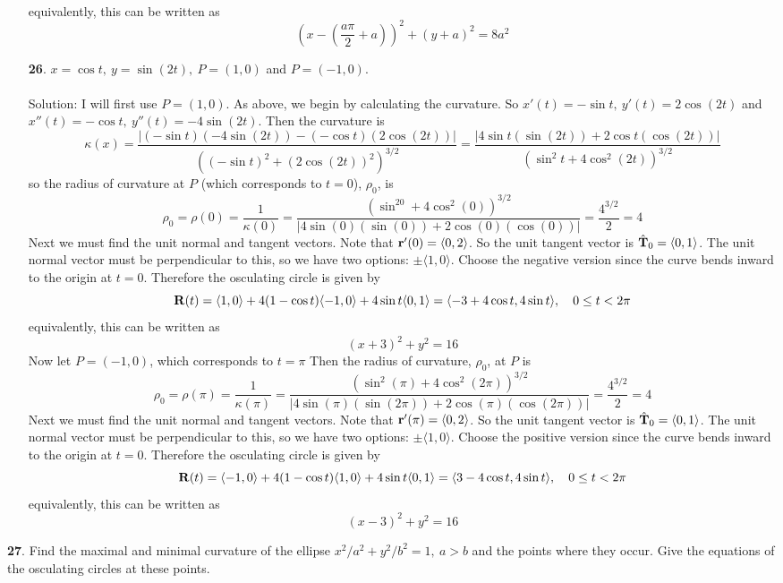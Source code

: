 \documentclass[12pt]{amsbook}
\newcommand{\la}{\langle}
\newcommand{\ra}{\rangle}
\begin{document}
\begin{enumerate}
\begin{eqnarray*}
\end{eqnarray*}  
  equivalently, this can be written as
  $$(x-(\frac{a\pi}{2}+a))^2+(y+a)^2=8a^2$$  
  \item[{\small\bf 26}.] $x=\cos t, \ y=\sin(2t), \ P=(1,0)$ and $P=(-1,0)$.
  \\
  \\
  {\sc Solution}: I will first use $P=(1,0)$. As above, we begin by calculating the curvature. So $x'(t)=-\sin t, \ y'(t)=2\cos(2t)$ and $x''(t)=-\cos t, \ y''(t)=-4\sin(2t)$. Then the curvature is
  $$\kappa(x)=\frac{|(-\sin t)(-4\sin(2t))-(-\cos t)(2\cos(2t))|}{((-\sin t)^2+(2\cos(2t))^2)^{3/2}}=\frac{|4\sin t(\sin(2t))+2\cos t(\cos(2t))|}{(\sin^2t+4\cos^2(2t))^{3/2}}$$
  so the radius of curvature at $P$ (which corresponds to $t=0$), $\rho_0$, is
  $$\rho_0=\rho(0)=\frac{1}{\kappa(0)}=\frac{(\sin^20+4\cos^2(0))^{3/2}}{|4\sin (0)(\sin(0))+2\cos (0)(\cos(0))|}=\frac{4^{3/2}}{2}=4$$
  Next we must find the unit normal and tangent vectors. Note that ${\bf r}'(0)=\la 0,2 \ra$. So the unit tangent vector is $\hat{\bf T}_0=\la 0,1 \ra$. The unit normal vector must be perpendicular to this, so we have two options: $\pm \la 1,0 \ra$. Choose the negative version since the curve bends inward to the origin at $t=0$. Therefore the osculating circle is given by
$${\bf R}(t)=\la 1,0 \ra + 4(1-\cos t)\la -1,0 \ra + 4\sin t \la 0,1 \ra = \la -3+4\cos t,4\sin t \ra, \ \ \ 0\leq t <2\pi$$
  equivalently, this can be written as
  $$(x+3)^2+y^2=16$$  
  Now let $P=(-1,0)$, which corresponds to $t=\pi$ Then the radius of curvature, $\rho_0$, at $P$ is
  $$\rho_0=\rho(\pi)=\frac{1}{\kappa(\pi)}=\frac{(\sin^2(\pi)+4\cos^2(2\pi))^{3/2}}{|4\sin (\pi)(\sin(2\pi))+2\cos (\pi)(\cos(2\pi))|}=\frac{4^{3/2}}{2}=4$$
  Next we must find the unit normal and tangent vectors. Note that ${\bf r}'(\pi)=\la 0,2 \ra$. So the unit tangent vector is $\hat{\bf T}_0=\la 0,1 \ra$. The unit normal vector must be perpendicular to this, so we have two options: $\pm \la 1,0 \ra$. Choose the positive version since the curve bends inward to the origin at $t=0$. Therefore the osculating circle is given by
$${\bf R}(t)=\la -1,0 \ra + 4(1-\cos t)\la 1,0 \ra + 4\sin t \la 0,1 \ra = \la 3-4\cos t,4\sin t \ra, \ \ \ 0\leq t <2\pi$$
  equivalently, this can be written as
  $$(x-3)^2+y^2=16$$  
\end{enumerate}
{\small\bf 27}. Find the maximal and minimal curvature of the ellipse $x^2/a^2+y^2/b^2=1, \ a>b$ and the points where they occur. Give the equations of the osculating circles at these points.
\\
\end{document}
